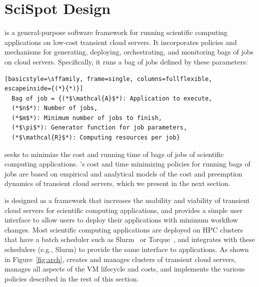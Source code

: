 \section{SciSpot Design}
\label{sec:design}





\sysname is a general-purpose software framework for running scientific computing applications on low-cost transient cloud servers.
It incorporates policies and mechanisms for generating, deploying, orchestrating, and monitoring bags of jobs on cloud servers.
Specifically, it runs a bag of jobs defined by these parameters:
\begin{lstlisting}[basicstyle=\sffamily, frame=single, columns=fullflexible, escapeinside={(*}{*)}]
  Bag of job = {(*$\mathcal{A}$*): Application to execute,
  (*$n$*): Number of jobs,
  (*$m$*): Minimum number of jobs to finish,
  (*$\pi$*): Generator function for job parameters,
  (*$\mathcal{R}$*): Computing resources per job}
\end{lstlisting}



\sysname seeks to minimize the cost and running time of bags of jobs of scientific computing applications.
\sysname's cost and time minimizing policies for running bags of jobs are based on empirical and analytical models of the cost and preemption dynamics of  transient cloud servers, which we present in the next section. 

\sysname is designed as a framework that increases the usability and viability of transient cloud servers for scientific computing applications, and provides a simple user interface to allow users to deploy their applications with minimum workflow changes. 
Most scientific computing applications are deployed on HPC clusters that have a batch scheduler such as Slurm~\cite{slurm} or Torque~\cite{torque}, and \sysname integrates with these schedulers (e.g., Slurm) to provide the same interface to applications. 
As shown in Figure~\ref{fig:arch},
\sysname creates and manages clusters of transient cloud servers, manages all aspects of the VM lifecycle and costs, and implements the various policies described in the rest of this section. 


